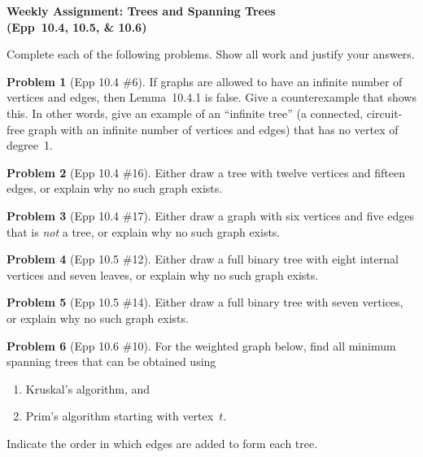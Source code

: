 \documentclass[11pt]{article}
\begin{document}
\begin{center}
  {\Large\bfseries Weekly Assignment: Trees and Spanning Trees\\[4pt]
   (Epp~10.4, 10.5, \& 10.6)}
\end{center}

\bigskip

\noindent
Complete each of the following problems.  Show all work and justify your answers.

\bigskip

\noindent\textbf{Problem 1} (Epp 10.4 \#6). \;
If graphs are allowed to have an infinite number of vertices and
edges, then Lemma~10.4.1 is false.  Give a counterexample that
shows this.  In other words, give an example of an ``infinite
tree'' (a connected, circuit-free graph with an infinite number
of vertices and edges) that has no vertex of degree~1.

\bigskip

\noindent\textbf{Problem 2} (Epp 10.4 \#16). \;
Either draw a tree with twelve vertices and fifteen edges,
or explain why no such graph exists.

\bigskip

\noindent\textbf{Problem 3} (Epp 10.4 \#17). \;
Either draw a graph with six vertices and five edges that is
\emph{not} a tree, or explain why no such graph exists.

\bigskip

\noindent\textbf{Problem 4} (Epp 10.5 \#12). \;
Either draw a full binary tree with eight internal vertices and
seven leaves, or explain why no such graph exists.

\bigskip

\noindent\textbf{Problem 5} (Epp 10.5 \#14). \;
Either draw a full binary tree with seven vertices,
or explain why no such graph exists.

\bigskip

\noindent\textbf{Problem 6} (Epp 10.6 \#10). \;
For the weighted graph below, find all minimum spanning trees
that can be obtained using
\begin{enumerate}[label=\textbf{(\alph*)}]
  \item Kruskal's algorithm, and
  \item Prim's algorithm starting with vertex~$t$.
\end{enumerate}
Indicate the order in which edges are added to form each tree.
\end{document}
